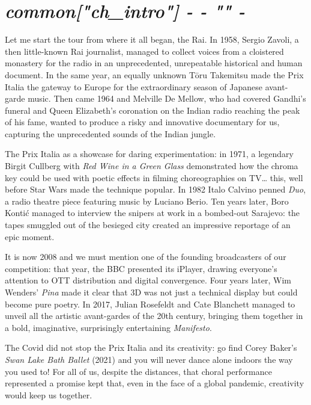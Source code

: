 \chapter*{\hfill{\slshape {{ common["ch_intro"] -}} {{- "}}" -}}
\thispagestyle{empty}
\vspace{70pt}
Let me start the tour from where it all began, the Rai. In 1958, Sergio Zavoli, a then little-known Rai journalist, managed to collect voices from a cloistered monastery for the radio in an unprecedented, unrepeatable historical and human document. In the same year, an equally unknown Tōru Takemitsu made the Prix Italia the gateway to Europe for the extraordinary season of Japanese avant-garde music. Then came 1964 and Melville De Mellow, who had covered Gandhi's funeral and Queen Elizabeth's coronation on the Indian radio reaching the peak of his fame, wanted to produce a risky and innovative documentary for us, capturing the unprecedented sounds of the Indian jungle.

The Prix Italia as a showcase for daring experimentation: in 1971, a legendary Birgit Cullberg with \textit{Red Wine in a Green Glass} demonstrated how the chroma key could be used with poetic effects in filming choreographies on TV\dots{} this, well before Star Wars made the technique popular. In 1982 Italo Calvino penned \textit{Duo}, a radio theatre piece featuring music by Luciano Berio. Ten years later, Boro Kontić managed to interview the snipers at work in a bombed-out Sarajevo: the tapes smuggled out of the besieged city created an impressive reportage of an epic moment.

It is now 2008 and we must mention one of the founding broadcasters of our competition: that year, the BBC presented its iPlayer, drawing everyone's attention to OTT distribution and digital convergence. Four years later, Wim Wenders' \textit{Pina} made it clear that 3D was not just a technical display but could become pure poetry. In 2017, Julian Rosefeldt and Cate Blanchett managed to unveil all the artistic avant-gardes of the 20th century, bringing them together in a bold, imaginative, surprisingly entertaining \textit{Manifesto}.

The Covid did not stop the Prix Italia and its creativity: go find Corey Baker's \textit{Swan Lake Bath Ballet} (2021) and you will never dance alone indoors the way you used to! For all of us, despite the distances, that choral performance represented a promise kept that, even in the face of a global pandemic, creativity would keep us together.


